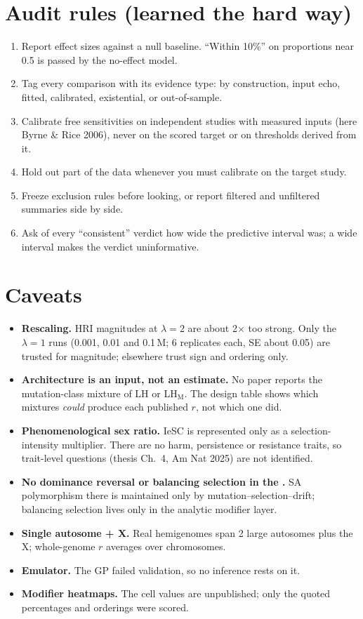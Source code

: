 \section{Audit rules (learned the hard way)}
\begin{enumerate}
\item Report effect sizes against a null baseline. ``Within 10\%'' on proportions near 0.5 is passed by the no-effect model.
\item Tag every comparison with its evidence type: by construction, input echo, fitted, calibrated, existential, or out-of-sample.
\item Calibrate free sensitivities on independent studies with measured inputs (here Byrne \& Rice 2006), never on the scored target or on thresholds derived from it.
\item Hold out part of the data whenever you must calibrate on the target study.
\item Freeze exclusion rules before looking, or report filtered and unfiltered summaries side by side.
\item Ask of every ``consistent'' verdict how wide the predictive interval was; a wide interval makes the verdict uninformative.
\end{enumerate}

\section{Caveats}
\begin{warnbox}
\begin{itemize}
\item \textbf{Rescaling.} HRI magnitudes at $\lambda=2$ are about 2$\times$ too strong. Only the $\lambda=1$ runs (0.001, 0.01 and 0.1\,M; 6 replicates each, SE about 0.05) are trusted for magnitude; elsewhere trust sign and ordering only.
\item \textbf{Architecture is an input, not an estimate.} No paper reports the mutation-class mixture of LH or LH$_\mathrm{M}$. The design table shows which mixtures \emph{could} produce each published $r$, not which one did.
\item \textbf{Phenomenological sex ratio.} IeSC is represented only as a selection-intensity multiplier. There are no harm, persistence or resistance traits, so trait-level questions (thesis Ch.\ 4, Am Nat 2025) are not identified.
\item \textbf{No dominance reversal or balancing selection in the \IBM.} SA polymorphism there is maintained only by mutation--selection--drift; balancing selection lives only in the analytic modifier layer.
\item \textbf{Single autosome + X.} Real hemigenomes span 2 large autosomes plus the X; whole-genome $r$ averages over chromosomes.
\item \textbf{Emulator.} The GP failed validation, so no inference rests on it.
\item \textbf{Modifier heatmaps.} The cell values are unpublished; only the quoted percentages and orderings were scored.
\end{itemize}
\end{warnbox}

